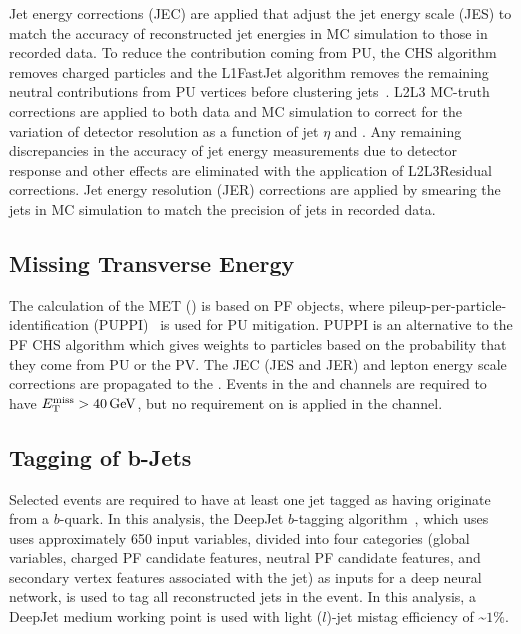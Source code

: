 Jet energy corrections (JEC) are applied that adjust the jet energy scale (JES) to match the accuracy of reconstructed jet energies in MC simulation to those in recorded data.
To reduce the contribution coming from PU, the CHS algorithm removes charged particles and the L1FastJet algorithm removes the remaining neutral contributions from PU vertices before clustering jets~\cite{bib:JME18001}.
L2L3 MC-truth corrections are applied to both data and MC simulation to correct for the variation of detector resolution as a function of jet $\eta$ and \pT.
Any remaining discrepancies in the accuracy of jet energy measurements due to detector response and other effects are eliminated with the application of L2L3Residual corrections.
Jet energy resolution (JER) corrections are applied by smearing the jets in MC simulation to match the precision of jets in recorded data.

\subsection{Missing Transverse Energy}
The calculation of the MET (\ETmiss) is based on PF objects, where pileup-per-particle-identification (PUPPI)~\cite{bib:PUPPI} is used for PU mitigation.
PUPPI is an alternative to the PF CHS algorithm which gives weights to particles based on the probability that they come from PU or the PV.
The JEC (JES and JER) and lepton energy scale corrections are propagated to the \ETmiss.
Events in the \mumu and \ee channels are required to have $\ETmiss > \SI{40}{\GeV}$, but no requirement on \ETmiss is applied in the \emu channel.

\subsection{Tagging of b-Jets}
Selected events are required to have at least one jet tagged as having originate from a $b$-quark.
In this analysis, the DeepJet $b$-tagging algorithm~\cite{bib:Bols_2020}, which uses uses approximately 650 input variables, divided into four categories (global variables, charged PF candidate features, neutral PF candidate features, and secondary vertex features associated with the jet) as inputs for a deep neural network, is used to tag all reconstructed jets in the event.
In this analysis, a DeepJet medium working point is used with light ($l$)-jet mistag efficiency of \sim$1\%$.

